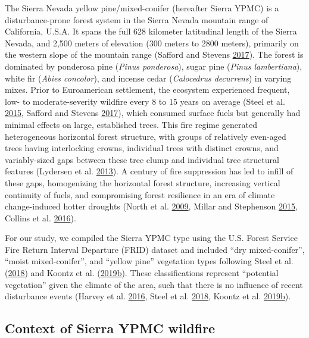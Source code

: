 \documentclass[twoside,12pt,final]{ucthesis-CA2012}
\begin{document}
\begin{ucmainmatter}
The Sierra Nevada yellow pine/mixed-conifer (hereafter Sierra YPMC) is a
disturbance-prone forest system in the Sierra Nevada mountain range of
California, U.S.A. It spans the full 628 kilometer latitudinal length of
the Sierra Nevada, and 2,500 meters of elevation (300 meters to 2800
meters), primarily on the western slope of the mountain range (Safford
and Stevens \protect\hyperlink{ref-safford2017}{2017}). The forest is
dominated by ponderosa pine (\emph{Pinus ponderosa}), sugar pine
(\emph{Pinus lambertiana}), white fir (\emph{Abies concolor}), and
incense cedar (\emph{Calocedrus decurrens}) in varying mixes. Prior to
Euroamerican settlement, the ecosystem experienced frequent, low- to
moderate-severity wildfire every 8 to 15 years on average (Steel et al.
\protect\hyperlink{ref-steel2015}{2015}, Safford and Stevens
\protect\hyperlink{ref-safford2017}{2017}), which consumed surface fuels
but generally had minimal effects on large, established trees. This fire
regime generated heterogeneous horizontal forest structure, with groups
of relatively even-aged trees having interlocking crowns, individual
trees with distinct crowns, and variably-sized gaps between these tree
clump and individual tree structural features (Lydersen et al.
\protect\hyperlink{ref-lydersen2013}{2013}). A century of fire
suppression has led to infill of these gaps, homogenizing the horizontal
forest structure, increasing vertical continuity of fuels, and
compromising forest resilience in an era of climate change-induced
hotter droughts (North et al. \protect\hyperlink{ref-north2009a}{2009},
Millar and Stephenson \protect\hyperlink{ref-millar2015}{2015}, Collins
et al. \protect\hyperlink{ref-collins2016}{2016}).

For our study, we compiled the Sierra YPMC type using the U.S. Forest
Service Fire Return Interval Departure (FRID) dataset and included ``dry
mixed-conifer'', ``moist mixed-conifer'', and ``yellow pine'' vegetation
types following Steel et al. (\protect\hyperlink{ref-steel2018}{2018})
and Koontz et al.
(\protect\hyperlink{ref-koontz2019a}{2019}\protect\hyperlink{ref-koontz2019a}{b}).
These classifications represent ``potential vegetation'' given the
climate of the area, such that there is no influence of recent
disturbance events (Harvey et al.
\protect\hyperlink{ref-harvey2016b}{2016}, Steel et al.
\protect\hyperlink{ref-steel2018}{2018}, Koontz et al.
\protect\hyperlink{ref-koontz2019a}{2019}\protect\hyperlink{ref-koontz2019a}{b}).

\subsection{Context of Sierra YPMC
wildfire}\label{context-of-sierra-ypmc-wildfire}


\end{ucmainmatter}
\end{document}
